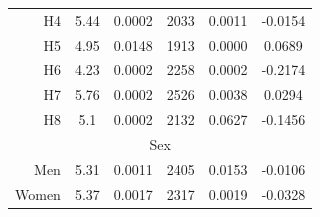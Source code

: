 \begin{table}[h!]
\begin{tabular}{rccccc|}
    \multicolumn{1}{|r|}{\cellcolor[HTML]{EFEFEF}H4}         & 5.44                                               & 0.0002                                                & 2033                                                & 0.0011                                            & -0.0154                                               \\
    \multicolumn{1}{|r|}{\cellcolor[HTML]{EFEFEF}H5}         & 4.95                                               & 0.0148                                                & 1913                                                & 0.0000                                            & 0.0689                                                \\
    \multicolumn{1}{|r|}{\cellcolor[HTML]{EFEFEF}H6}         & 4.23                                               & 0.0002                                                & 2258                                                & 0.0002                                            & -0.2174                                               \\
    \multicolumn{1}{|r|}{\cellcolor[HTML]{EFEFEF}H7}         & 5.76                                               & 0.0002                                                & 2526                                                & 0.0038                                            & 0.0294                                                \\
    \multicolumn{1}{|r|}{\cellcolor[HTML]{EFEFEF}H8}         & 5.1                                                & 0.0002                                                & 2132                                                & 0.0627                                            & -0.1456                                               \\ \hline
    \multicolumn{6}{|c|}{\cellcolor[HTML]{BCFBBB}Sex}                                                                                                                                                                                                                                                                                       \\ \hline
    \multicolumn{1}{|r|}{\cellcolor[HTML]{B7FDFA}Men}        & 5.31                                               & 0.0011                                                & 2405                                                & 0.0153                                            & -0.0106                                               \\
    \multicolumn{1}{|r|}{\cellcolor[HTML]{FFBED5}Women}      & 5.37                                               & 0.0017                                                & 2317                                                & 0.0019                                            & -0.0328                                               \\ \hline
    \end{tabular}
\end{table}


